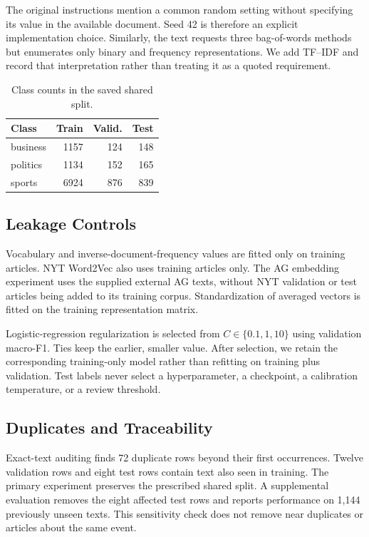 \documentclass[11pt]{article}
\begin{document}
The original instructions mention a common random setting without specifying its value in the available document. Seed 42 is therefore an explicit implementation choice. Similarly, the text requests three bag-of-words methods but enumerates only binary and frequency representations. We add TF--IDF and record that interpretation rather than treating it as a quoted requirement.

\begin{table}[h]
\centering\small
\begin{tabular}{lrrr}\toprule
Class & Train & Valid. & Test\\\midrule
business & 1157 & 124 & 148 \\
politics & 1134 & 152 & 165 \\
sports & 6924 & 876 & 839 \\
\bottomrule\end{tabular}
\caption{Class counts in the saved shared split.}
\end{table}

\subsection{Leakage Controls}
Vocabulary and inverse-document-frequency values are fitted only on training articles. NYT Word2Vec also uses training articles only. The AG embedding experiment uses the supplied external AG texts, without NYT validation or test articles being added to its training corpus. Standardization of averaged vectors is fitted on the training representation matrix.

Logistic-regression regularization is selected from $C\in\{0.1,1,10\}$ using validation macro-F1. Ties keep the earlier, smaller value. After selection, we retain the corresponding training-only model rather than refitting on training plus validation. Test labels never select a hyperparameter, a checkpoint, a calibration temperature, or a review threshold.

\subsection{Duplicates and Traceability}
Exact-text auditing finds 72 duplicate rows beyond their first occurrences. Twelve validation rows and eight test rows contain text also seen in training. The primary experiment preserves the prescribed shared split. A supplemental evaluation removes the eight affected test rows and reports performance on 1,144 previously unseen texts. This sensitivity check does not remove near duplicates or articles about the same event.
\end{document}

